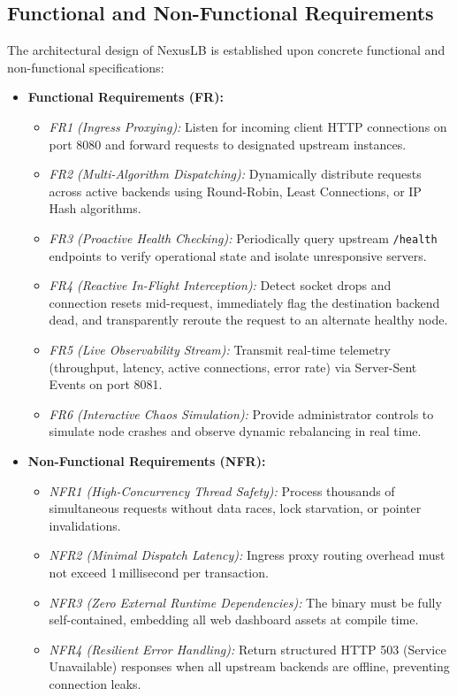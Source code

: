 \documentclass[12pt,openany]{report}
\begin{document}
\subsection{Functional and Non-Functional Requirements}

The architectural design of NexusLB is established upon concrete functional and non-functional specifications:

\begin{itemize}
  \item \textbf{Functional Requirements (FR):}
    \begin{itemize}
      \item \textit{FR1 (Ingress Proxying):} Listen for incoming client HTTP connections on port 8080 and forward requests to designated upstream instances.
      \item \textit{FR2 (Multi-Algorithm Dispatching):} Dynamically distribute requests across active backends using Round-Robin, Least Connections, or IP Hash algorithms.
      \item \textit{FR3 (Proactive Health Checking):} Periodically query upstream \texttt{/health} endpoints to verify operational state and isolate unresponsive servers.
      \item \textit{FR4 (Reactive In-Flight Interception):} Detect socket drops and connection resets mid-request, immediately flag the destination backend dead, and transparently reroute the request to an alternate healthy node.
      \item \textit{FR5 (Live Observability Stream):} Transmit real-time telemetry (throughput, latency, active connections, error rate) via Server-Sent Events on port 8081.
      \item \textit{FR6 (Interactive Chaos Simulation):} Provide administrator controls to simulate node crashes and observe dynamic rebalancing in real time.
    \end{itemize}
  \item \textbf{Non-Functional Requirements (NFR):}
    \begin{itemize}
      \item \textit{NFR1 (High-Concurrency Thread Safety):} Process thousands of simultaneous requests without data races, lock starvation, or pointer invalidations.
      \item \textit{NFR2 (Minimal Dispatch Latency):} Ingress proxy routing overhead must not exceed 1\,millisecond per transaction.
      \item \textit{NFR3 (Zero External Runtime Dependencies):} The binary must be fully self-contained, embedding all web dashboard assets at compile time.
      \item \textit{NFR4 (Resilient Error Handling):} Return structured HTTP 503 (Service Unavailable) responses when all upstream backends are offline, preventing connection leaks.
    \end{itemize}
\end{itemize}
\end{document}
